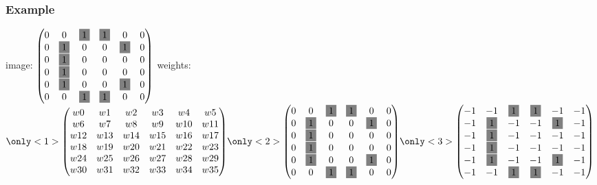 \begin{frame}
  \frametitle{Example}
  image:
  \nolinebreak
  $
  \left(
    \begin{matrix}
      0 & 0 & \colorbox{gray}{1} & \colorbox{gray}{1} & 0 & 0 \\
      0 & \colorbox{gray}{1} & 0 & 0 & \colorbox{gray}{1} & 0 \\
      0 & \colorbox{gray}{1} & 0 & 0 & 0 & 0 \\
      0 & \colorbox{gray}{1} & 0 & 0 & 0 & 0 \\
      0 & \colorbox{gray}{1} & 0 & 0 & \colorbox{gray}{1} & 0 \\
      0 & 0 & \colorbox{gray}{1} & \colorbox{gray}{1} & 0 & 0
    \end{matrix}
  \right)
  $
  \newline
  weights:
  \nolinebreak
  $
  \only<1>{
    \left(
      \begin{matrix}
        w0 & w1 & w2 & w3 & w4 & w5 \\
        w6 & w7 & w8 & w9 & w10 & w11 \\
        w12 & w13 & w14 & w15 & w16 & w17 \\
        w18 & w19 & w20 & w21 & w22 & w23 \\
        w24 & w25 & w26 & w27 & w28 & w29 \\
        w30 & w31 & w32 & w33 & w34 & w35
      \end{matrix}
    \right)
  }
  \only<2>{
    \left(
    \begin{matrix}
      0 & 0 & \colorbox{gray}{1} & \colorbox{gray}{1} & 0 & 0 \\
      0 & \colorbox{gray}{1} & 0 & 0 & \colorbox{gray}{1} & 0 \\
      0 & \colorbox{gray}{1} & 0 & 0 & 0 & 0 \\
      0 & \colorbox{gray}{1} & 0 & 0 & 0 & 0 \\
      0 & \colorbox{gray}{1} & 0 & 0 & \colorbox{gray}{1} & 0 \\
      0 & 0 & \colorbox{gray}{1} & \colorbox{gray}{1} & 0 & 0
    \end{matrix}
    \right)
  }
  \only<3>{
    \left(
    \begin{matrix}
      -1 & -1 & \colorbox{gray}{1} & \colorbox{gray}{1} & -1 & -1 \\
      -1 & \colorbox{gray}{1} & -1 & -1 & \colorbox{gray}{1} & -1 \\
      -1 & \colorbox{gray}{1} & -1 & -1 & -1 & -1 \\
      -1 & \colorbox{gray}{1} & -1 & -1 & -1 & -1 \\
      -1 & \colorbox{gray}{1} & -1 & -1 & \colorbox{gray}{1} & -1 \\
      -1 & -1 & \colorbox{gray}{1} & \colorbox{gray}{1} & -1 & -1
    \end{matrix}
    \right)
  }
  $
\end{frame}

